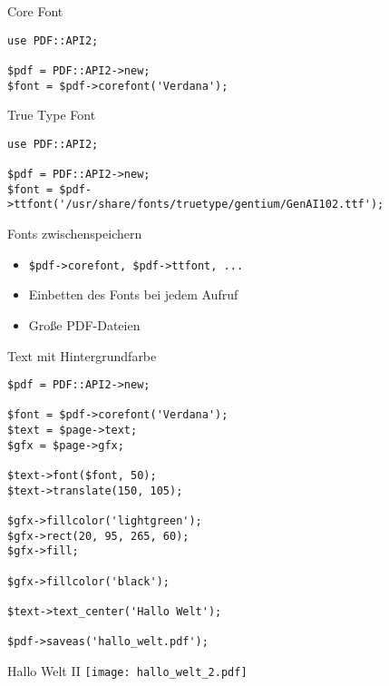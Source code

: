\begin{frame}[fragile]{Core Font}
\begin{lstlisting}
use PDF::API2;

$pdf = PDF::API2->new;
$font = $pdf->corefont('Verdana');
\end{lstlisting}
\end{frame}


\begin{frame}[fragile]{True Type Font}
\begin{lstlisting}
use PDF::API2;

$pdf = PDF::API2->new;
$font = $pdf->ttfont('/usr/share/fonts/truetype/gentium/GenAI102.ttf');
\end{lstlisting}
\end{frame}

\begin{frame}[fragile]{Fonts zwischenspeichern}
\begin{itemize}
\item \begin{verbatim}$pdf->corefont, $pdf->ttfont, ... \end{verbatim} 
\item Einbetten des Fonts bei jedem Aufruf
\item Große PDF-Dateien
\end{itemize}
\end{frame}

\begin{frame}[fragile]{Text mit Hintergrundfarbe}
\begin{lstlisting}
$pdf = PDF::API2->new;

$font = $pdf->corefont('Verdana');
$text = $page->text;
$gfx = $page->gfx;

$text->font($font, 50);
$text->translate(150, 105);

$gfx->fillcolor('lightgreen');
$gfx->rect(20, 95, 265, 60);
$gfx->fill;

$gfx->fillcolor('black');

$text->text_center('Hallo Welt');

$pdf->saveas('hallo_welt.pdf');
\end{lstlisting}
\end{frame}

\begin{frame}{Hallo Welt II}
\texttt{[image: hallo\_welt\_2.pdf]}
\end{frame}

